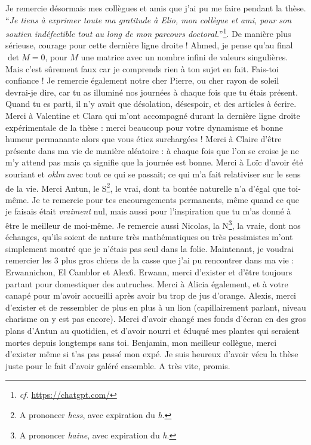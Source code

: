 Je remercie désormais mes collègues et amis que j'ai pu me faire pendant la thèse. 
``\emph{Je tiens à exprimer toute ma gratitude à Elio, mon collègue et ami, pour son soutien indéfectible tout au long de mon parcours doctoral.}''\footnote{\emph{cf.} \url{https://chatgpt.com/}}.
De manière plus sérieuse, courage pour cette dernière ligne droite ! Ahmed, je pense qu'au final $\det{M} = 0$, pour $M$ une matrice avec un nombre infini de valeurs singulières. Mais c'est sûrement faux car je comprends rien à ton sujet en fait. Fais-toi confiance ! 
Je remercie également notre cher Pierre, ou cher rayon de soleil devrai-je dire, car tu as illuminé nos journées à chaque fois que tu étais présent. Quand tu es parti, il n'y avait que désolation, désespoir, et des articles à écrire.
Merci à Valentine et Clara qui m'ont accompagné
durant la dernière ligne droite expérimentale de la thèse : merci beaucoup pour votre dynamisme et bonne humeur permanante alors que vous étiez surchargées !
Merci à Claire d'être présente dans ma vie de manière aléatoire : à chaque fois que l'on se croise je ne m'y attend pas mais ça signifie que la journée est bonne.
Merci à Loïc d'avoir été souriant et \emph{oklm} avec tout ce qui se passait; ce qui m'a fait relativiser sur le sens de la vie.
Merci Antun, le S\footnote{A prononcer \emph{hess}, avec expiration du \emph{h}.}, le vrai, dont ta bontée naturelle n'a d'égal que toi-même.
Je te remercie pour tes encouragements permanents, même quand ce que je faisais était \emph{vraiment} nul, mais aussi pour l'inspiration que tu m'as donné à être le meilleur de moi-même.
Je remercie aussi Nicolas, la N\footnote{A prononcer \emph{haine}, avec expiration du \emph{h}.}, la vraie, dont nos échanges, qu'ils soient de nature très mathématiques ou très pessimistes m'ont simplement
montré que je n'étais pas seul dans la folie. Maintenant, je voudrai remercier les 3 plus gros chiens de la casse que j'ai pu rencontrer dans ma vie : Erwannichon, El Camblor et Alex6. 
Erwann, merci d'exister et d'être toujours partant pour domestiquer des autruches. Merci à Alicia également,
et à votre canapé pour m'avoir accueilli après avoir bu trop de jus d'orange. Alexis, merci d'exister et 
de ressembler de plus en plus à un lion (capillairement parlant, niveau charisme on y est pas encore). Merci d'avoir changé mes fonds d'écran en des gros plans d'Antun au quotidien, et d'avoir nourri et 
éduqué mes plantes qui seraient mortes depuis longtemps sans toi. Benjamin, mon meilleur collègue, merci d'exister même si 
t'as pas passé mon expé. Je suis heureux d'avoir vécu la thèse juste pour le fait d'avoir galéré ensemble. A très vite, promis.

